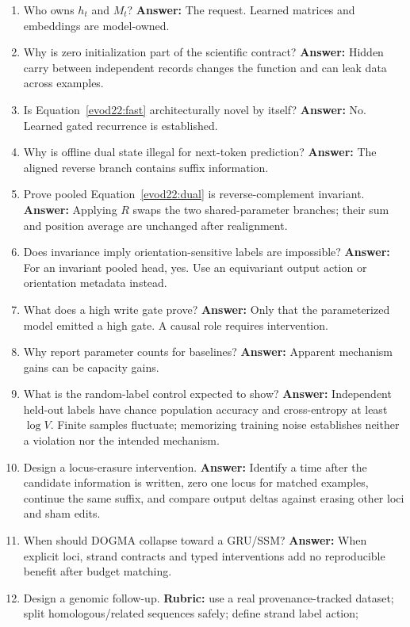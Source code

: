 \begin{enumerate}
\item Who owns $h_t$ and $M_t$? \textbf{Answer:} The request. Learned matrices and
embeddings are model-owned.
\item Why is zero initialization part of the scientific contract?
\textbf{Answer:} Hidden carry between independent records changes the function and
can leak data across examples.
\item Is Equation~\ref{evod22:fast} architecturally novel by itself?
\textbf{Answer:} No. Learned gated recurrence is established.
\item Why is offline dual state illegal for next-token prediction?
\textbf{Answer:} The aligned reverse branch contains suffix information.
\item Prove pooled Equation~\ref{evod22:dual} is reverse-complement invariant.
\textbf{Answer:} Applying $R$ swaps the two shared-parameter branches; their sum and
position average are unchanged after realignment.
\item Does invariance imply orientation-sensitive labels are impossible?
\textbf{Answer:} For an invariant pooled head, yes. Use an equivariant output action
or orientation metadata instead.
\item What does a high write gate prove?
\textbf{Answer:} Only that the parameterized model emitted a high gate. A causal
role requires intervention.
\item Why report parameter counts for baselines?
\textbf{Answer:} Apparent mechanism gains can be capacity gains.
\item What is the random-label control expected to show?
\textbf{Answer:} Independent held-out labels have chance population accuracy and
cross-entropy at least $\log V$. Finite samples fluctuate; memorizing training
noise establishes neither a violation nor the intended mechanism.
\item Design a locus-erasure intervention. \textbf{Answer:} Identify a time after
the candidate information is written, zero one locus for matched examples, continue
the same suffix, and compare output deltas against erasing other loci and sham edits.
\item When should DOGMA collapse toward a GRU/SSM?
\textbf{Answer:} When explicit loci, strand contracts and typed interventions add no
reproducible benefit after budget matching.
\item Design a genomic follow-up. \textbf{Rubric:} use a real provenance-tracked
dataset; split homologous/related sequences safely; define strand label action;

\end{enumerate}

